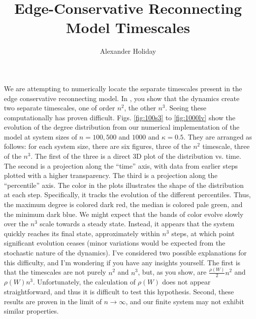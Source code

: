 \documentclass[11pt]{article}
\begin{document}
\title{\vspace{-5mm}Edge-Conservative Reconnecting Model Timescales}
\author{Alexander Holiday}
\maketitle

We are attempting to numerically locate the separate timescales present in the edge conservative reconnecting model. In \cite{Rath2012}, you show that the dynamics create two separate timescales, one of order $n^{2}$, the other $n^{3}$. Seeing these computationally has proven difficult. Figs. \ref{fig:100s3} to \ref{fig:1000lv} show the evolution of the degree distribution from our numerical implementation of the model at system sizes of $n=100, 500$ and $1000$ and $\kappa = 0.5$. They are arranged as follows: for each system size, there are six figures, three of the $n^{2}$ timescale, three of the $n^{3}$. The first of the three is a direct 3D plot of the distribution vs. time. The second is a projection along the ``time'' axis, with data from earlier steps plotted with a higher transparency. The third is a projection along the ``percentile'' axis. The color in the plots illustrates the shape of the distribution at each step. Specifically, it tracks the evolution of the different percentiles. Thus, the maximum degree is colored dark red, the median is colored pale green, and the minimum dark blue. We might expect that the bands of color evolve slowly over the $n^{3}$ scale towards a steady state. Instead, it appears that the system quickly reaches its final state, approximately within $n^{3}$ steps, at which point significant evolution ceases (minor variations would be expected from the stochastic nature of the dynamics). I've considered two possible explanations for this difficulty, and I'm wondering if you have any insights yourself. The first is that the timescales are not purely $n^{2}$ and $n^{3}$, but, as you show, are $\frac{\rho(W)}{2} n^{2}$ and $\rho(W) n^{3}$. Unfortunately, the calculation of $\rho(W)$ does not appear straightforward, and thus it is difficult to test this hypothesis. Second, these results are proven in the limit of $n \rightarrow \infty$, and our finite system may not exhibit similar properties.


\end{document}

